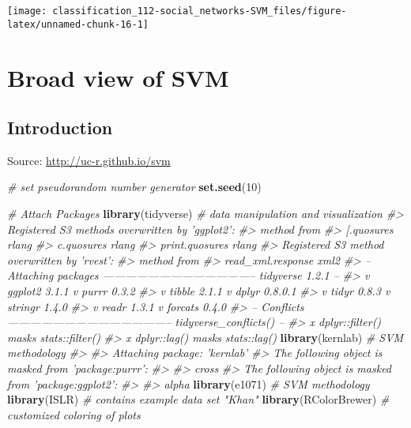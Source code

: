 \documentclass[]{book}
\newenvironment{Shaded}{\begin{snugshade}}{\end{snugshade}}
\newcommand{\CommentTok}[1]{\textcolor[rgb]{0.56,0.35,0.01}{\textit{#1}}}
\newcommand{\DecValTok}[1]{\textcolor[rgb]{0.00,0.00,0.81}{#1}}
\newcommand{\KeywordTok}[1]{\textcolor[rgb]{0.13,0.29,0.53}{\textbf{#1}}}
\newcommand{\NormalTok}[1]{#1}
\begin{document}
\begin{center}\texttt{[image: classification\_112-social\_networks-SVM\_files/figure-latex/unnamed-chunk-16-1]} \end{center}

\hypertarget{broad-view-of-svm}{%
\chapter{Broad view of SVM}\label{broad-view-of-svm}}

\hypertarget{introduction-2}{%
\section{Introduction}\label{introduction-2}}

Source: \url{http://uc-r.github.io/svm}

\begin{Shaded}
\begin{Highlighting}[]
\CommentTok{# set pseudorandom number generator}
\KeywordTok{set.seed}\NormalTok{(}\DecValTok{10}\NormalTok{)}

\CommentTok{# Attach Packages}
\KeywordTok{library}\NormalTok{(tidyverse)    }\CommentTok{# data manipulation and visualization}
\CommentTok{#> Registered S3 methods overwritten by 'ggplot2':}
\CommentTok{#>   method         from }
\CommentTok{#>   [.quosures     rlang}
\CommentTok{#>   c.quosures     rlang}
\CommentTok{#>   print.quosures rlang}
\CommentTok{#> Registered S3 method overwritten by 'rvest':}
\CommentTok{#>   method            from}
\CommentTok{#>   read_xml.response xml2}
\CommentTok{#> -- Attaching packages ----------------------------------------- tidyverse 1.2.1 --}
\CommentTok{#> v ggplot2 3.1.1       v purrr   0.3.2  }
\CommentTok{#> v tibble  2.1.1       v dplyr   0.8.0.1}
\CommentTok{#> v tidyr   0.8.3       v stringr 1.4.0  }
\CommentTok{#> v readr   1.3.1       v forcats 0.4.0}
\CommentTok{#> -- Conflicts -------------------------------------------- tidyverse_conflicts() --}
\CommentTok{#> x dplyr::filter() masks stats::filter()}
\CommentTok{#> x dplyr::lag()    masks stats::lag()}
\KeywordTok{library}\NormalTok{(kernlab)      }\CommentTok{# SVM methodology}
\CommentTok{#> }
\CommentTok{#> Attaching package: 'kernlab'}
\CommentTok{#> The following object is masked from 'package:purrr':}
\CommentTok{#> }
\CommentTok{#>     cross}
\CommentTok{#> The following object is masked from 'package:ggplot2':}
\CommentTok{#> }
\CommentTok{#>     alpha}
\KeywordTok{library}\NormalTok{(e1071)        }\CommentTok{# SVM methodology}
\KeywordTok{library}\NormalTok{(ISLR)         }\CommentTok{# contains example data set "Khan"}
\KeywordTok{library}\NormalTok{(RColorBrewer) }\CommentTok{# customized coloring of plots}
\end{Highlighting}
\end{Shaded}
\end{document}
